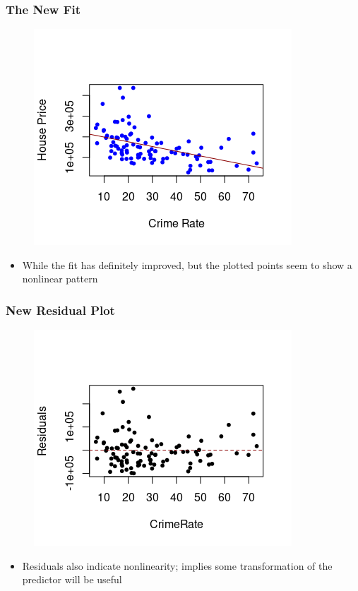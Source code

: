 \documentclass[compress]{beamer}
\begin{document}
\begin{frame}
\frametitle{\sc The New Fit}
    \begin{figure}[!ht]
		\centering
		\includegraphics[scale=0.7]{figs8/scatter-reg-new.png}
	\end{figure}
\begin{itemize}
\item While the fit has definitely improved, but the plotted points seem to show a nonlinear pattern
\end{itemize}	
	
\end{frame}


\begin{frame}
\frametitle{\sc New Residual Plot}
    \begin{figure}[!ht]
		\centering
		\includegraphics[scale=0.7]{figs8/residual-new.png}
	\end{figure}
\begin{itemize}
\item Residuals also indicate nonlinearity; implies some transformation of the predictor will be useful
\end{itemize}	
\end{frame}
\end{document}
